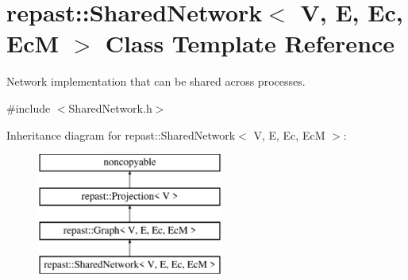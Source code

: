 \hypertarget{classrepast_1_1_shared_network}{\section{repast\-:\-:Shared\-Network$<$ V, E, Ec, Ec\-M $>$ Class Template Reference}
\label{classrepast_1_1_shared_network}
}


Network implementation that can be shared across processes.  




{\ttfamily \#include $<$Shared\-Network.\-h$>$}

Inheritance diagram for repast\-:\-:Shared\-Network$<$ V, E, Ec, Ec\-M $>$\-:\begin{figure}[H]
\begin{center}
\leavevmode
\includegraphics[height=4.000000cm]{classrepast_1_1_shared_network}
\end{center}
\end{figure}
